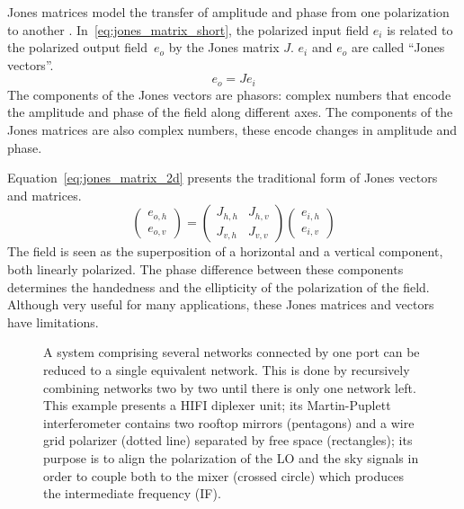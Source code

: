 \documentclass[journal]{IEEEtran}
\begin{document}
Jones matrices model the transfer of amplitude and phase from one polarization to another \cite{hecht2002optics}.
In~\eqref{eq:jones_matrix_short}, the polarized input field $e_i$ is related to the polarized output field~$e_o$ by the Jones matrix $J$.
$e_i$ and $e_o$ are called ``Jones vectors''.
\begin{equation}
    e_o = J e_i
    \label{eq:jones_matrix_short}
\end{equation}
The components of the Jones vectors are phasors: complex numbers that encode the amplitude and phase of the field along different axes.
The components of the Jones matrices are also complex numbers, these encode changes in amplitude and phase.

Equation~\eqref{eq:jones_matrix_2d} presents the traditional form of Jones vectors and matrices.
\begin{equation}
    \begin{pmatrix}
        e_{o, h}\\
        e_{o, v}
    \end{pmatrix}
    =
    \begin{pmatrix}
        J_{h, h}   &   J_{h, v} \\
        J_{v, h}   &   J_{v, v}
    \end{pmatrix}
    \begin{pmatrix}
        e_{i, h}\\
        e_{i, v}
    \end{pmatrix}
    \label{eq:jones_matrix_2d}
\end{equation}
The field is seen as the superposition of a horizontal and a vertical component, both linearly polarized.
The phase difference between these components determines the handedness and the ellipticity of the polarization of the field.
Although very useful for many applications, these Jones matrices and vectors have limitations.

\begin{figure} %
    \centering
    
    \caption{
    A system comprising several networks connected by one port can be reduced to a single equivalent network.
    This is done by recursively combining networks two by two until there is only one network left.
    This example presents a HIFI diplexer unit; its Martin-Puplett interferometer contains two rooftop mirrors (pentagons) and a wire grid polarizer (dotted line) separated by free space (rectangles); its purpose is to align the polarization of the LO and the sky signals in order to couple both to the mixer (crossed circle) which produces the intermediate frequency (IF).
    }%
    \label{fig:cascading_example}
\end{figure}
\end{document}
